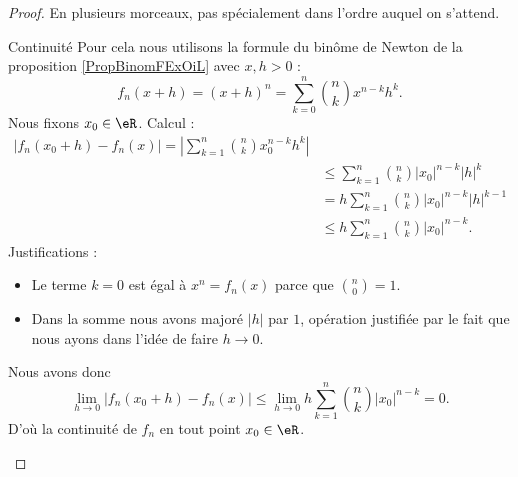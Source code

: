 \begin{proof}
    En plusieurs morceaux, pas spécialement dans l'ordre auquel on s'attend.
    \begin{subproof}
        \item[Continuité] 
            Pour cela nous utilisons la formule du binôme de Newton de la proposition \ref{PropBinomFExOiL} avec \( x,h>0\) :
            \begin{equation}
                f_n(x+h)=(x+h)^n=\sum_{k=0}^n{n\choose k}x^{n-k}h^k.
            \end{equation}
            Nous fixons \( x_0\in \eR\). Calcul :
            \begin{subequations}
                \begin{align}
                    | f_n(x_0+h)-f_n(x) |=| \sum_{k=1}^n{n\choose k}x_0^{n-k}h^k |\\
                    &\leq \sum_{k=1}^n{n\choose k}| x_0 |^{n-k} |h|^k\\
                    &=h\sum_{k=1}^n{n\choose k}| x_0 |^{n-k}| h |^{k-1}\\
                    &\leq h\sum_{k=1}^n{n\choose k}| x_0 |^{n-k}.
                \end{align}
            \end{subequations}
            Justifications :
            \begin{itemize}
                \item 
                   Le terme \( k=0\) est égal à \( x^n=f_n(x)\) parce que \( {n\choose 0}=1\).
               \item
                   Dans la somme nous avons majoré \( | h |\) par \( 1\), opération justifiée par le fait que nous ayons dans l'idée de faire \( h\to 0\).
            \end{itemize}
            Nous avons donc
            \begin{equation}
                \lim_{h\to 0} | f_n(x_0+h)-f_n(x) | \leq\lim_{h\to 0}  h\sum_{k=1}^n{n\choose k}| x_0 |^{n-k}=0.
            \end{equation}
            D'où la continuité de \( f_n\) en tout point \( x_0\in \eR\).


\end{subproof}
\end{proof}
